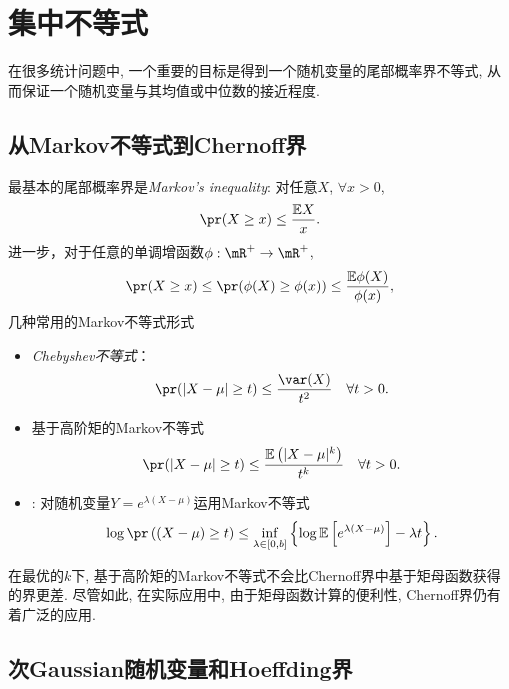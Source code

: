 \section{集中不等式}
  
在很多统计问题中, 一个重要的目标是得到一个随机变量的尾部概率界不等式, 从而保证一个随机变量与其均值或中位数的接近程度. 

\subsection{从Markov不等式到Chernoff界}
最基本的尾部概率界是\emph{Markov's inequality}: 	对任意$X$, $\forall x >0$,
	\begin{align*}
		\pr(X \geq x) \leq \frac{\E X}{x}.
	\end{align*}
进一步，对于任意的单调增函数$\phi: \mR^{+} \to \mR^{+}$, 
\begin{align*}
	\pr(X \geq x) \leq \pr(\phi(X) \geq \phi(x)) \leq \frac{\E \phi(X)}{\phi(x)},
\end{align*}
几种常用的Markov不等式形式
\begin{itemize}
	\item \emph{Chebyshev不等式}：
	\begin{align*}
		\pr(|X-\mu| \geq t) \leq \frac{\var(X)}{t^{2}} \quad  \forall t>0.
	  \end{align*}
\item  基于高阶矩的Markov不等式
 \begin{align*}
	\pr(|X-\mu| \geq t) \leq \frac{\E\left(|X-\mu|^{k}\right)}{t^{k}} \quad  \forall t>0.
  \end{align*}
  \item {}: 对随机变量$Y=e^{\lambda(X-\mu)}$运用Markov不等式
  \begin{align*}
	\log \pr\left((X-\mu) \geq t\right) \leq \inf _{\lambda \in[0, b]}\left\{\log \E\left[e^{\lambda(X-\mu)}\right]-\lambda t\right\}.
  \end{align*}
\end{itemize}

\begin{remark}
	在最优的$k$下, 基于高阶矩的Markov不等式不会比Chernoff界中基于矩母函数获得的界更差. 尽管如此, 在实际应用中, 由于矩母函数计算的便利性, Chernoff界仍有着广泛的应用.
\end{remark}

  


  \subsection{次Gaussian随机变量和Hoeffding界}

